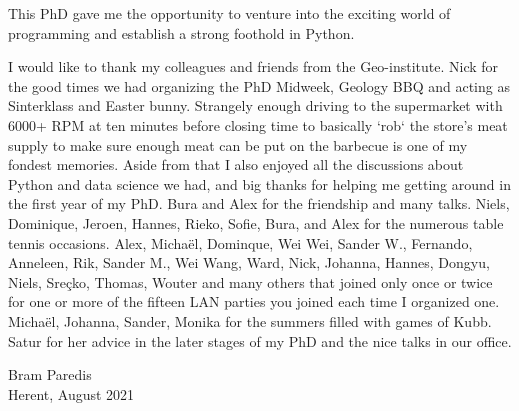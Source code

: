 This PhD gave me the opportunity to venture into the exciting world of programming and establish a strong foothold in Python. %

I would like to thank my colleagues and friends from the Geo-institute. %
Nick for the good times we had organizing the PhD Midweek, Geology BBQ and acting as Sinterklass and Easter bunny. Strangely enough driving to the supermarket with 6000+ RPM at ten minutes before closing time to basically `rob` the store's meat supply to make sure enough meat can be put on the barbecue is one of my fondest memories. %
Aside from that I also enjoyed all the discussions about Python and data science we had, and big thanks for helping me getting around in the first year of my PhD. %
Bura and Alex for the friendship and many talks. %
Niels, Dominique, Jeroen, Hannes, Rieko, Sofie, Bura, and Alex for the numerous table tennis occasions. %
Alex, Michaël, Dominque, Wei Wei, Sander W., Fernando, Anneleen, Rik, Sander M., Wei Wang, Ward, Nick, Johanna, Hannes, Dongyu, Niels, Sreçko, Thomas, Wouter and many others that joined only once or twice for one or more of the fifteen LAN parties you joined each time I organized one. %
Michaël, Johanna, Sander, Monika for the summers filled with games of Kubb. %
Satur for her advice in the later stages of my PhD and the nice talks in our office. %


\begin{flushright}
    Bram Paredis \\
    Herent, August 2021
\end{flushright}

\instructionspreface


\cleardoublepage

